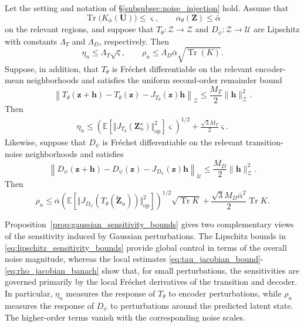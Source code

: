 \documentclass[11pt]{article}
\newcommand{\bbE}{\mathbb{E}}
\newcommand{\wt}{\widetilde}
\newcommand{\ol}{\overline}
\begin{document}
\begin{proposition}
\label{prop:gaussian_sensitivity_bounds}
Let the setting and notation of \S\ref{subsubsec:noise_injection} hold.
Assume that
\[
    \operatorname{Tr}\bigl(K_\phi(\mathbf U)\bigr)
    \leq \varsigma,
    \qquad
    \alpha_\theta(\mathbf Z)\leq \bar\alpha
\]
on the relevant regions, and suppose that $T_\theta:\mathcal Z\to\mathcal Z$
and $D_\psi:\mathcal Z\to\mathcal U$ are Lipschitz with constants $\Lambda_T$ and $\Lambda_D$, respectively. Then
\begin{equation}
    \eta_n
    \leq
    \Lambda_T\sqrt{\varsigma},
    \qquad
    \rho_n
    \leq
    \Lambda_D\bar\alpha
    \sqrt{\operatorname{Tr}(K)}.
    \label{eq:lipschitz_sensitivity_bounds}
\end{equation}
Suppose, in addition, that $T_\theta$ is Fr\'echet differentiable on the relevant encoder-mean neighborhoods and satisfies the uniform second-order remainder bound
\[
    \left\|
        T_\theta(\mathbf z+\mathbf h)
        -
        T_\theta(\mathbf z)
        -
        J_{T_\theta}(\mathbf z)\mathbf h
    \right\|_{\mathcal Z}
    \leq
    \frac{M_T}{2}\|\mathbf h\|_{\mathcal Z}^2.
\]
Then
\begin{equation}
\begin{aligned}
    \eta_n
    \leq\left(\bbE\left[\Vert J_{T_\theta}(\mathbf Z^\star_n)\Vert_\mathrm{op}^2\right]\varsigma\right)^{1/2}+\frac{\sqrt{3}M_T}{2}\varsigma.
    \label{eq:tau_jacobian_bound}
\end{aligned}
\end{equation}
Likewise, suppose that $D_\psi$ is Fr\'echet differentiable on the relevant transition-noise neighborhoods and satisfies
\[
    \left\|
        D_\psi(\mathbf z+\mathbf h)
        -
        D_\psi(\mathbf z)
        -
        J_{D_\psi}(\mathbf z)\mathbf h
    \right\|_{\mathcal U}
    \leq
    \frac{M_D}{2}\|\mathbf h\|_{\mathcal Z}^2.
\]
Then
\begin{equation}
\rho_n\leq\ol\alpha\left(\bbE\left[\Vert J_{D_\psi}(T_\theta(\wt{\mathbf Z}_n))\Vert_\mathrm{op}^2\right]\right)^{1/2}\sqrt{\operatorname{Tr} K}+\frac{\sqrt{3}M_D\ol\alpha^2}{2}\operatorname{Tr} K.
    \label{eq:rho_jacobian_banach}
\end{equation}
\end{proposition}

Proposition~\ref{prop:gaussian_sensitivity_bounds} gives two complementary views of the sensitivity induced by Gaussian perturbations. The Lipschitz bounds in \eqref{eq:lipschitz_sensitivity_bounds} provide global control in terms of the overall noise magnitude, whereas the local estimates \eqref{eq:tau_jacobian_bound}-\eqref{eq:rho_jacobian_banach} show that, for small perturbations, the sensitivities are governed primarily by the local Fr\'echet derivatives of the transition and decoder. In particular, $\eta_n$ measures the response of $T_\theta$ to encoder perturbations, while $\rho_n$ measures the response of $D_\psi$ to perturbations around the predicted latent state. The higher-order terms vanish with the corresponding noise scales.
\end{document}
